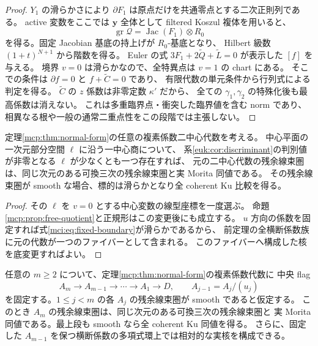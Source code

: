 \begin{proof}
$Y_1$ の滑らかさにより $\partial F_1$ は原点だけを共通零点とする二次正則列である。
active 変数をここでは $\mathbf y$ 全体として filtered Koszul 複体を用いると、
\[
            \operatorname{gr}\mathcal Q=\operatorname{Jac}(F_1)\otimes R_0
\]
を得る。固定 Jacobian 基底の持上げが $R_0$-基底となり、
Hilbert 級数 $(1+t)^{N+1}$ から階数を得る。
Euler の式 $3F_1+2\widetilde Q+\widetilde L=0$ が表示した $[f]$ を与える。
境界 $v=0$ は滑らかなので、全特異点は $v=1$ の chart にある。
そこでの条件は $\partial f=0$ と $f+\widetilde C=0$ であり、
有限代数の単元条件から行列式による判定を得る。
$\widetilde C$ の $z$ 係数は非零定数 $\kappa'$ だから、
全ての $\gamma_1,\gamma_2$ の特殊化後も最高係数は消えない。
これは多重臨界点・衝突した臨界値を含む norm であり、
相異なる根や一般の通常二重点性をこの段階では主張しない。
\end{proof}

\begin{corollary}[少なくとも一本の滑らかな中央切断]
\label{mci:cor:smooth-ray}
定理\ref{mcp:thm:normal-form}の任意の複素係数二中心代数を考える。
中心平面の一次元部分空間 $\ell$ に沿う一中心商について、
系\ref{euk:cor:discriminant}の判別値が非零となる $\ell$ が少なくとも一つ存在すれば、
元の二中心代数の残余線束圏は、同じ次元のある可換三次の残余線束圏と実 Morita 同値である。
その残余線束圏が smooth な場合、標的は滑らかとなり全 coherent Ku 比較を得る。
\end{corollary}

\begin{proof}
その $\ell$ を $v=0$ とする中心変数の線型座標を一度選ぶ。
命題\ref{mcp:prop:free-quotient}と正規形はこの変更後にも成立する。
$u$ 方向の係数を固定すれば式\eqref{mci:eq:fixed-boundary}が滑らかであるから、
前定理の全横断係数族に元の代数が一つのファイバーとして含まれる。
このファイバーへ構成した核を底変更すればよい。
\end{proof}

\begin{corollary}
\label{mci:cor:smooth-flag}
任意の $m\ge2$ について、定理\ref{mcp:thm:normal-form}の複素係数代数に
中央 flag
\[
 A_m\longrightarrow A_{m-1}\longrightarrow\cdots
       \longrightarrow A_1\longrightarrow D,
 \qquad A_{j-1}=A_j/(u_j)
\]
を固定する。$1\le j<m$ の各 $A_j$ の残余線束圏が smooth であると仮定する。
このとき $A_m$ の残余線束圏は、同じ次元のある可換三次の残余線束圏と
実 Morita 同値である。最上段も smooth なら全 coherent Ku 同値を得る。
さらに、固定した $A_{m-1}$ を保つ横断係数の多項式環上では相対的な実核を構成できる。
\end{corollary}

